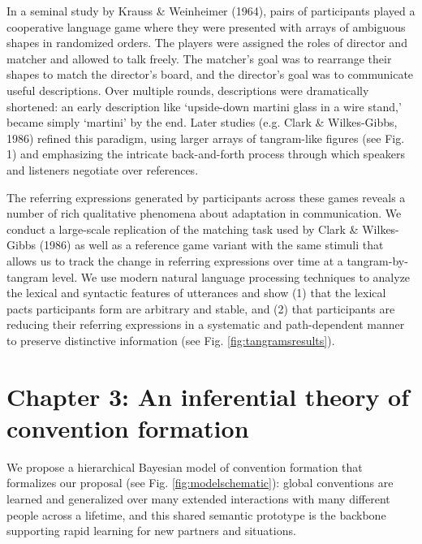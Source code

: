 \documentclass[12pt, donotrepeattitle, man, floatsintext]{apa6}
\begin{document}
In a seminal study by Krauss \& Weinheimer (1964), pairs of participants played a cooperative language game where they were presented with arrays of ambiguous shapes in randomized orders. The players were assigned the roles of director and matcher and allowed to talk freely. The matcher's goal was to rearrange their shapes to match the director's board, and the director's goal was to communicate useful descriptions. Over multiple rounds, descriptions were dramatically shortened: an early description like `upside-down martini glass in a wire stand,' became simply `martini' by the end. Later studies (e.g. Clark \& Wilkes-Gibbs, 1986) refined this paradigm, using larger arrays of tangram-like figures (see Fig. 1) and emphasizing the intricate back-and-forth process through which speakers and listeners negotiate over references.

The referring expressions generated by participants across these games reveals a number of rich qualitative phenomena about adaptation in communication. We conduct a large-scale replication of the matching task used by Clark \& Wilkes-Gibbs (1986) as well as a reference game variant with the same stimuli that allows us to track the change in referring expressions over time at a tangram-by-tangram level. We use modern natural language processing techniques to analyze the lexical and syntactic features of utterances and show (1) that the lexical pacts participants form are arbitrary and stable, and (2) that participants are reducing their referring expressions in a systematic and path-dependent manner to preserve distinctive information (see Fig. \ref{fig:tangramsresults}).

\noindent{}
\section{Chapter 3: An inferential theory of convention formation}

We propose a hierarchical Bayesian model of convention formation that formalizes our proposal (see Fig. \ref{fig:modelschematic}): global conventions are learned and generalized over many extended interactions with many different people across a lifetime, and  this shared semantic prototype is the backbone supporting rapid learning for new partners and situations. 
\end{document}
